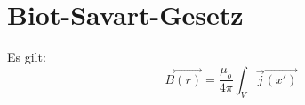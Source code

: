 \documentclass {scrartcl}
\begin{document}
\section{Biot-Savart-Gesetz}
Es gilt:
  \begin{equation}
    \vec{B}
    \vec{(r)}
    =
    \frac{\mu_o}{4\pi}
    \int_V
    \vec{j}
    \vec{(x')}
  \end{equation}
\end{document}
